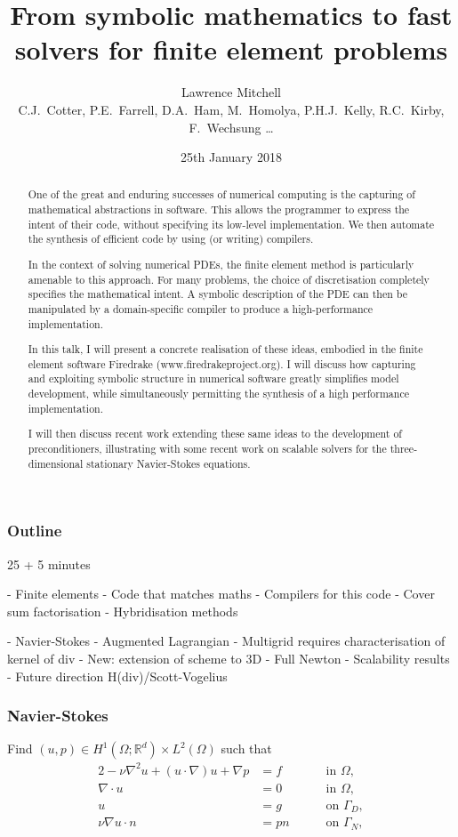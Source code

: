 \documentclass[presentation]{beamer}
\date{25th January 2018}
\author{Lawrence Mitchell\inst{1,*} \\ {\scriptsize C.J.~Cotter,
    P.E.~Farrell, D.A.~Ham, M.~Homolya, P.H.J.~Kelly, R.C.~Kirby, F.~Wechsung \ldots}}
\institute{
\inst{1}Department of Computer Science, Durham University

\inst{*}\texttt{lawrence.mitchell@durham.ac.uk}
}
\title{From symbolic mathematics to fast solvers for finite element problems}
\newcommand{\honev}{\ensuremath{{H}^1(\Omega; \mathbb{R}^d)}\xspace}
\newcommand{\ltwo}{\ensuremath{{L}^2(\Omega)}\xspace}
\newcommand{\advect}[2]{\ensuremath{(#2 \cdot \nabla) #1}}
\begin{document}
\begin{abstract}
  One of the great and enduring successes of numerical computing is
  the capturing of mathematical abstractions in software.  This allows
  the programmer to express the intent of their code, without
  specifying its low-level implementation.  We then automate the
  synthesis of efficient code by using (or writing) compilers.

  In the context of solving numerical PDEs, the finite element method
  is particularly amenable to this approach.  For many problems, the
  choice of discretisation completely specifies the mathematical
  intent.  A symbolic description of the PDE can then be manipulated
  by a domain-specific compiler to produce a high-performance
  implementation.

  In this talk, I will present a concrete realisation of these ideas,
  embodied in the finite element software Firedrake
  (www.firedrakeproject.org).  I will discuss how capturing and
  exploiting symbolic structure in numerical software greatly
  simplifies model development, while simultaneously permitting the
  synthesis of a high performance implementation.

  I will then discuss recent work extending these same ideas to the
  development of preconditioners, illustrating with some recent work
  on scalable solvers for the three-dimensional stationary
  Navier-Stokes equations.
\end{abstract}


\begin{frame}
  \frametitle{Outline}

  25 + 5 minutes

  - Finite elements
  - Code that matches maths
  - Compilers for this code
  - Cover sum factorisation
  - Hybridisation methods

  - Navier-Stokes
  - Augmented Lagrangian
  - Multigrid requires characterisation of kernel of div
  - New: extension of scheme to 3D
  - Full Newton
  - Scalability results
  - Future direction H(div)/Scott-Vogelius
\end{frame}

\begin{frame}
  \frametitle{Navier-Stokes}
Find $(u, p) \in \honev \times \ltwo$ such that
\begin{alignat*}{2}
  -  \nu \nabla^2 u + \advect{u}{u} + \nabla p &= f \quad && \text{ in } \Omega, \label{eqn:momentum} \\
  \nabla \cdot u &= 0 \quad && \text{ in } \Omega, \\
  u &= g \quad && \text{ on } \Gamma_D, \\
  \nu \nabla u \cdot n &= pn \quad && \text{ on } \Gamma_N,
\end{alignat*}
\end{frame}
\end{document}
